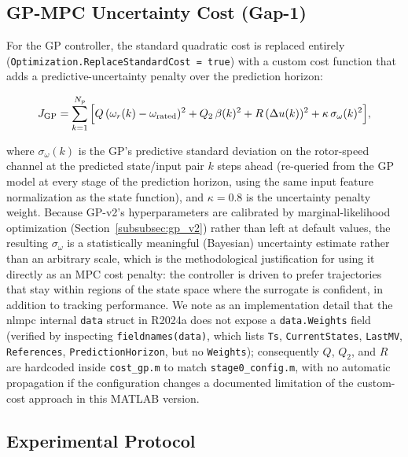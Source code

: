 \subsection{GP-MPC Uncertainty Cost (Gap-1)}
\label{subsec:gp_uncertainty_cost}

For the GP controller, the standard quadratic cost is replaced entirely
(\texttt{Optimization.ReplaceStandardCost = true}) with a custom cost
function that adds a predictive-uncertainty penalty over the prediction
horizon:

\begin{equation}
J_{\text{GP}} = \sum_{k=1}^{N_p} \Big[ Q\,(\omega_r(k)-\omega_{\text{rated}})^2
+ Q_2\,\beta(k)^2 + R\,(\Delta u(k))^2
+ \kappa\,\sigma_{\omega}(k)^2 \Big],
\label{eq:gp_mpc_cost}
\end{equation}

where $\sigma_{\omega}(k)$ is the GP's predictive standard deviation on
the rotor-speed channel at the predicted state/input pair $k$ steps ahead
(re-queried from the GP model at every stage of the prediction horizon,
using the same input feature normalization as the state function), and
$\kappa=0.8$ is the uncertainty penalty weight. Because GP-v2's
hyperparameters are calibrated by marginal-likelihood optimization
(Section~\ref{subsubsec:gp_v2}) rather than left at default values, the
resulting $\sigma_\omega$ is a statistically meaningful (Bayesian)
uncertainty estimate rather than an arbitrary scale, which is the
methodological justification for using it directly as an MPC cost penalty:
the controller is driven to prefer trajectories that stay within regions
of the state space where the surrogate is confident, in addition to
tracking performance. We note as an implementation detail that the nlmpc
internal \texttt{data} struct in R2024a does not expose a
\texttt{data.Weights} field (verified by inspecting
\texttt{fieldnames(data)}, which lists \texttt{Ts},
\texttt{CurrentStates}, \texttt{LastMV}, \texttt{References},
\texttt{PredictionHorizon}, but no \texttt{Weights}); consequently $Q$,
$Q_2$, and $R$ are hardcoded inside \texttt{cost\_gp.m} to match
\texttt{stage0\_config.m}, with no automatic propagation if the
configuration changes a documented limitation of the custom-cost
approach in this MATLAB version.

\subsection{Experimental Protocol}
\label{subsec:experimental_protocol}


